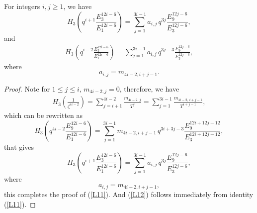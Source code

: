\documentclass[10pt,a4paper]{amsart}
\begin{document}
\begin{lemma}
	For integers $i,j \geq 1$, we have
	\begin{equation}\label{L11}
		H_{3}\!\left(q^{i+1}\frac{E_{3}^{12i-6}}{E_{1}^{12i-6}}\right)=
\sum_{j=1}^{3i-1} a_{i,j}\,
		q^{3j}\frac{E_{9}^{12j-6}}{E_{3}^{12j-6}},
	\end{equation}
	and
	\begin{align}\label{L12}
			H_{3}\!\left(q^{i-2}\frac{E_{3}^{12i-6}}{E_{1}^{12i-6}}\right)=
		\sum_{j=1}^{3i-1} a_{i,j}\,
		q^{3j-3}\frac{E_{9}^{12j-6}}{E_{3}^{12j-6}},
	\end{align}
	where
	\begin{equation*}
		a_{i,j}=m_{4i-2,i+j-1}.
	\end{equation*}
\end{lemma}

\begin{proof}
Note for $1\leq j \leq i$, $m_{4i-2,j}=0$, therefore, we have
\noindent
\begin{align*}\label{a15}
	H_3\!\left(\frac{1}{\zeta^{4i-2}}\right)
	= \sum_{j= i+1}^{4i-2} \frac{m_{4i-2,\,j}}{T^{j}}
	= \sum_{j= 1}^{3i-1} \frac{m_{4i-2,\,i+j-1}}{T^{i+j-1}},
\end{align*}
which can be rewritten as
\begin{equation*}
	H_{3}\!\left(q^{4i-2}\frac{E_{9}^{12i-6}}{E_{1}^{12i-6}}\right)
	=
	\sum_{j=1}^{3i-1}
	m_{4i-2,i+j-1}\,
	q^{3i+3j-3}
	\frac{E_{9}^{12i+12j-12}}{E_{3}^{12i+12j-12}},
\end{equation*}
that gives
\begin{equation*}
H_{3}\!\left(q^{i+1}\frac{E_{3}^{12i-6}}{E_{1}^{12i-6}}\right)
=
\sum_{j=1}^{3i-1} a_{i,j}\,
q^{3j}\frac{E_{9}^{12j-6}}{E_{3}^{12j-6}},
\end{equation*}
where
\[
a_{i,j}=m_{4i-2,i+j-1},
\]
this completes the proof of (\ref{L11}). And (\ref{L12}) follows immediately from identity (\ref{L11}).
\end{proof}
\end{document}
